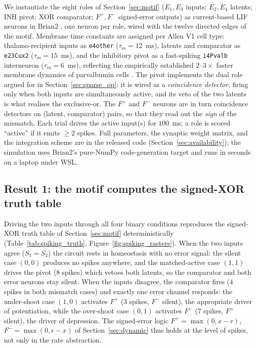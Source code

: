 We instantiate the eight roles of Section~\ref{sec:motif}
($E_1, E_3$ inputs; $E_2, E_4$ latents; $\mathrm{INH}$ pivot;
$\mathrm{XOR}$ comparator; $F^+, F^-$ signed-error outputs) as current-based
LIF neurons in Brian2 \citep{Stimberg2019}, one neuron per role, wired with
the twelve directed edges of the motif. Membrane time constants are assigned
per Allen V1 cell type: thalamo-recipient inputs as \texttt{e4other}
($\tau_m=12$~ms), latents and comparator as \texttt{e23Cux2}
($\tau_m=15$~ms), and the inhibitory pivot as a fast-spiking
\texttt{i4Pvalb} interneuron ($\tau_m=6$~ms), reflecting the empirically
established $2$--$3\times$ faster membrane dynamics of parvalbumin cells
\citep{Cardin2009,Atallah2012}. The pivot implements the dual role argued for
in Section~\ref{sec:sparse_op}: it is wired as a \emph{coincidence detector},
firing only when both inputs are simultaneously active, and its veto of the
two latents is what realises the exclusive-or. The $F^+$ and $F^-$ neurons are
in turn coincidence detectors on (latent, comparator) pairs, so that they read
out the \emph{sign} of the mismatch. Each trial drives the active input(s) for
$100$~ms; a role is scored ``active'' if it emits $\geq 2$ spikes. Full
parameters, the synaptic weight matrix, and the integration scheme are in the
released code (Section~\ref{sec:availability}); the simulation uses Brian2's
pure-NumPy code-generation target and runs in seconds on a laptop under WSL.

\subsection{Result 1: the motif computes the signed-XOR truth table}
\label{sec:spiking_truth}

Driving the two inputs through all four binary conditions reproduces the
signed-XOR truth table of Section~\ref{sec:motif} deterministically
(Table~\ref{tab:spiking_truth}, Figure~\ref{fig:spiking_rasters}).
When the two inputs agree ($S_1=S_2$) the circuit rests in homeostasis with no
error signal: the silent case $(0,0)$ produces no spikes anywhere, and the
matched-active case $(1,1)$ drives the pivot ($8$ spikes) which vetoes both
latents, so the comparator and both error neurons stay silent. When the inputs
disagree, the comparator fires ($4$ spikes in both mismatch cases) and exactly
one error channel responds: the under-shoot case $(1,0)$ activates $F^+$
($3$ spikes, $F^-$ silent), the appropriate driver of potentiation, while the
over-shoot case $(0,1)$ activates $F^-$ ($7$ spikes, $F^+$ silent), the driver
of depression. The signed-error logic
$F^+ = \max(0, x-r)$, $F^- = \max(0, r-x)$ of Section~\ref{sec:dynamic} thus
holds at the level of spikes, not only in the rate abstraction.


